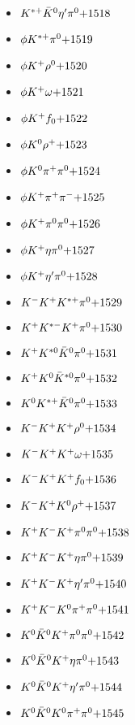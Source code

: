 \begin{multicols}{3}
\begin{itemize}
 \item $ K^{*+} \bar{K}^{0} {\eta^{\prime}} \pi^{0} \hfill{+1518}$
 \item $ \phi K^{*+} \pi^{0} \hfill{+1519}$
 \item $ \phi K^{+} \rho^{0} \hfill{+1520}$
 \item $ \phi K^{+} \omega \hfill{+1521}$
 \item $ \phi K^{+} f_{0} \hfill{+1522}$
 \item $ \phi K^{0} \rho^{+} \hfill{+1523}$
 \item $ \phi K^{0} \pi^{+} \pi^{0} \hfill{+1524}$
 \item $ \phi K^{+} \pi^{+} \pi^{-} \hfill{+1525}$
 \item $ \phi K^{+} \pi^{0} \pi^{0} \hfill{+1526}$
 \item $ \phi K^{+} \eta \pi^{0} \hfill{+1527}$
 \item $ \phi K^{+} {\eta^{\prime}} \pi^{0} \hfill{+1528}$
 \item $ K^{-} K^{+} K^{*+} \pi^{0} \hfill{+1529}$
 \item $ K^{+} K^{*-} K^{+} \pi^{0} \hfill{+1530}$
 \item $ K^{+} K^{*0} \bar{K}^{0} \pi^{0} \hfill{+1531}$
 \item $ K^{+} K^{0} \bar{K}^{*0} \pi^{0} \hfill{+1532}$
 \item $ K^{0} K^{*+} \bar{K}^{0} \pi^{0} \hfill{+1533}$
 \item $ K^{-} K^{+} K^{+} \rho^{0} \hfill{+1534}$
 \item $ K^{-} K^{+} K^{+} \omega \hfill{+1535}$
 \item $ K^{-} K^{+} K^{+} f_{0} \hfill{+1536}$
 \item $ K^{-} K^{+} K^{0} \rho^{+} \hfill{+1537}$
 \item $ K^{+} K^{-} K^{+} \pi^{0} \pi^{0} \hfill{+1538}$
 \item $ K^{+} K^{-} K^{+} \eta \pi^{0} \hfill{+1539}$
 \item $ K^{+} K^{-} K^{+} {\eta^{\prime}} \pi^{0} \hfill{+1540}$
 \item $ K^{+} K^{-} K^{0} \pi^{+} \pi^{0} \hfill{+1541}$
 \item $ K^{0} \bar{K}^{0} K^{+} \pi^{0} \pi^{0} \hfill{+1542}$
 \item $ K^{0} \bar{K}^{0} K^{+} \eta \pi^{0} \hfill{+1543}$
 \item $ K^{0} \bar{K}^{0} K^{+} {\eta^{\prime}} \pi^{0} \hfill{+1544}$
 \item $ K^{0} \bar{K}^{0} K^{0} \pi^{+} \pi^{0} \hfill{+1545}$

\end{itemize}
\end{multicols}
